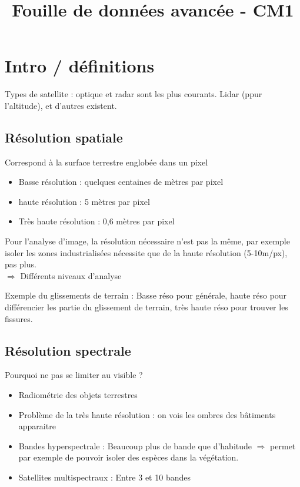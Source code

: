 \documentclass[11pt,a4paper]{article}
\title{Fouille de données avancée - CM1}
\begin{document}
	
	\maketitle
	
	\section{Intro / définitions}
	
	Types de satellite : optique et radar sont les plus courants. Lidar (ppur l'altitude), et d'autres existent.
	
	\subsection{Résolution spatiale}
	
	Correspond à la surface terrestre englobée dans un pixel
	\begin{itemize}
		\item Basse résolution : quelques centaines de mètres par pixel
		\item haute résolution : 5 mètres par pixel
		\item Très haute résolution : 0,6 mètres par pixel
	\end{itemize}

	Pour l'analyse d'image, la résolution nécessaire n'est pas la même, par exemple isoler les zones industrialisées nécessite que de la haute résolution (5-10m/px), pas plus.\\
	$\Rightarrow$ Différents niveaux d'analyse
	
	Exemple du glissements de terrain : Basse réso pour générale, haute réso pour différencier les partie du glissement de terrain, très haute réso pour trouver les fissures.
	
	\subsection{Résolution spectrale}
	
	Pourquoi ne pas se limiter au visible ?\\
	
	\begin{itemize}
		\item Radiométrie des objets terrestres
		\item Problème de la très haute résolution : on vois les ombres des bâtiments apparaitre
		\item Bandes hyperspectrale : Beaucoup plus de bande que d'habitude $\Rightarrow$ permet par exemple de pouvoir isoler des espèces dans la végétation.
		\item Satellites multispectraux : Entre 3 et 10 bandes
	\end{itemize}
\end{document}
